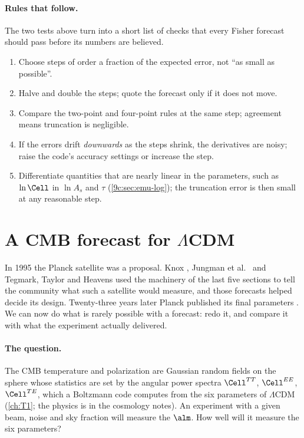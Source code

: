 \paragraph{Rules that follow.} The two tests above turn into a short list of checks that every Fisher
forecast should pass before its numbers are believed.
\begin{enumerate}
  \item Choose steps of order a fraction of the expected error, not ``as small as possible''.
  \item Halve and double the steps; quote the forecast only if it does not move.
  \item Compare the two-point and four-point rules at the same step; agreement means truncation is negligible.
  \item If the errors drift \emph{downwards} as the steps shrink, the derivatives are noisy; raise the code's
        accuracy settings or increase the step.
  \item Differentiate quantities that are nearly linear in the parameters, such as $\ln\Cell$ in $\ln A_s$ and
        $\tau$ (\cref{9c:sec:emu-log}); the truncation error is then small at any reasonable step.
\end{enumerate}
\section{A CMB forecast for \texorpdfstring{$\Lambda$CDM}{LCDM}}
\label{10a:sec:cmb}

In 1995 the Planck satellite was a proposal. Knox \cite{Knox1995}, Jungman et al.\ \cite{Jungman1996} and Tegmark,
Taylor and Heavens \cite{TTH1997} used the machinery of the last five sections to tell the community what such a
satellite would measure, and those forecasts helped decide its design. Twenty-three years later Planck
published its final parameters \cite{Planck2018VI}. We can now do what is rarely possible with a forecast:
redo it, and compare it with what the experiment actually delivered.

\paragraph{The question.} The CMB temperature and polarization are Gaussian random fields on the sphere whose
statistics are set by the angular power spectra $\Cell^{TT}$, $\Cell^{EE}$, $\Cell^{TE}$, which a Boltzmann code computes
from the six parameters of $\Lambda$CDM (\cref{ch:T1}; the physics is in the cosmology notes). An experiment with a
given beam, noise and sky fraction will measure the $\alm$. How well will it measure the six parameters?

